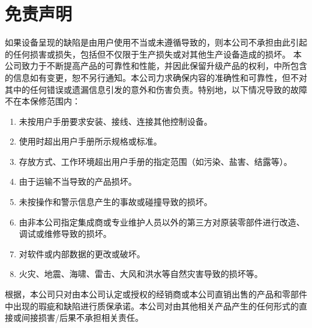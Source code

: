 \section{免责声明}
如果设备呈现的缺陷是由用户使用不当或未遵循{\ThisBook}导致的，则本公司不承担由此引起的任何损害或损失，包括但不仅限于生产损失或对其他生产设备造成的损坏。
本公司致力于不断提高产品的可靠性和性能，并因此保留升级产品的权利，{\ThisBook}中所包含的信息如有变更，恕不另行通知。本公司力求确保{\ThisBook}内容的准确性和可靠性，但不对其中的任何错误或遗漏信息引发的意外和伤害负责。特别地，以下情况导致的故障不在本保修范围内：
\begin{enumerate}
\item 未按用户手册要求安装、接线、连接其他控制设备。
\item 使用时超出用户手册所示规格或标准。
\item 存放方式、工作环境超出用户手册的指定范围（如污染、盐害、结露等）。
\item 由于运输不当导致的产品损坏。
\item 未按操作和警示信息产生的事故或碰撞导致的损坏。
\item 由非本公司指定集成商或专业维护人员以外的第三方对原装零部件进行改造、调试或维修导致的损坏。
\item 对软件或内部数据的更改或破坏。
\item 火灾、地震、海啸、雷击、大风和洪水等自然灾害导致的损坏等。
\end{enumerate}

根据{\TheSec}，本公司只对由本公司认定或授权的经销商或本公司直销出售的产品和零部件中出现的瑕疵和缺陷进行质保承诺。本公司对由其他相关产品产生的任何形式的直接或间接损害/后果不承担相关责任。
